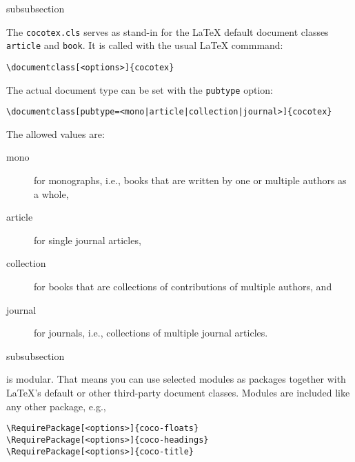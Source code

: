 \begin{Heading}{subsubsection}
\end{Heading}

The \lstinline{cocotex.cls} serves as stand-in for the {\LaTeX}
default document classes \lstinline{article} and \lstinline{book}. It
is called with the usual {\LaTeX} commmand:
\begin{lstlisting}[style=tex]
\documentclass[<options>]{cocotex}
\end{lstlisting}

The actual document type can be set with the \lstinline{pubtype} option:
\begin{lstlisting}[style=tex]
\documentclass[pubtype=<mono|article|collection|journal>]{cocotex}
\end{lstlisting}
The allowed values are:
\begin{description}
\item[\ttfamily mono] for monographs, i.e., books that are written by one or
  multiple authors as a whole,
\item[\ttfamily article] for single journal articles,
\item[\ttfamily collection] for books that are collections of contributions of
  multiple authors, and
\item[\ttfamily journal] for journals, i.e., collections of multiple journal
  articles.
\end{description}


\begin{Heading}[label=sec:modules]{subsubsection}
\end{Heading}

{\CoCoTeX} is modular. That means you can use selected modules as
packages together with \LaTeX's default or other third-party document
classes. Modules are included like any other package, e.g.,
\begin{lstlisting}[style=tex]
\RequirePackage[<options>]{coco-floats}
\RequirePackage[<options>]{coco-headings}
\RequirePackage[<options>]{coco-title}
\end{lstlisting}

